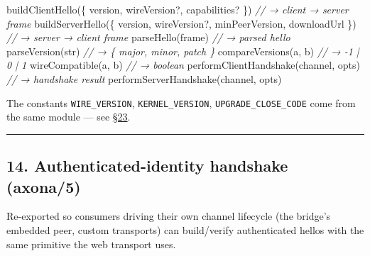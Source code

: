 \documentclass[
  nobib]{tufte-handout}
\newenvironment{Shaded}{}{}
\newcommand{\CommentTok}[1]{\textcolor[rgb]{0.38,0.63,0.69}{\textit{#1}}}
\newcommand{\FunctionTok}[1]{\textcolor[rgb]{0.02,0.16,0.49}{#1}}
\newcommand{\NormalTok}[1]{#1}
\newcommand{\OperatorTok}[1]{\textcolor[rgb]{0.40,0.40,0.40}{#1}}
\begin{document}
\begin{Shaded}
\begin{Highlighting}[]
\FunctionTok{buildClientHello}\NormalTok{(\{ version}\OperatorTok{,}\NormalTok{ wireVersion}\OperatorTok{?,}\NormalTok{ capabilities}\OperatorTok{?}\NormalTok{ \})          }\CommentTok{// → client → server frame}
\FunctionTok{buildServerHello}\NormalTok{(\{ version}\OperatorTok{,}\NormalTok{ wireVersion}\OperatorTok{?,}\NormalTok{ minPeerVersion}\OperatorTok{,}\NormalTok{ downloadUrl \}) }\CommentTok{// → server → client frame}
\FunctionTok{parseHello}\NormalTok{(frame)                                                   }\CommentTok{// → parsed hello}
\FunctionTok{parseVersion}\NormalTok{(str)                                                   }\CommentTok{// → \{ major, minor, patch \}}
\FunctionTok{compareVersions}\NormalTok{(a}\OperatorTok{,}\NormalTok{ b)                                               }\CommentTok{// → {-}1 | 0 | 1}
\FunctionTok{wireCompatible}\NormalTok{(a}\OperatorTok{,}\NormalTok{ b)                                                }\CommentTok{// → boolean}
\FunctionTok{performClientHandshake}\NormalTok{(channel}\OperatorTok{,}\NormalTok{ opts)                               }\CommentTok{// → handshake result}
\FunctionTok{performServerHandshake}\NormalTok{(channel}\OperatorTok{,}\NormalTok{ opts)}
\end{Highlighting}
\end{Shaded}

The constants \texttt{WIRE\_VERSION}, \texttt{KERNEL\_VERSION},
\texttt{UPGRADE\_CLOSE\_CODE} come from the same module --- see
\hyperref[23-constants]{§23}.

\begin{center}\rule{0.5\linewidth}{0.5pt}\end{center}

\subsection{14. Authenticated-identity handshake
(axona/5)}\label{authenticated-identity-handshake-axona5}

Re-exported so consumers driving their own channel lifecycle (the
bridge's embedded peer, custom transports) can build/verify
authenticated hellos with the same primitive the web transport uses.
\end{document}
